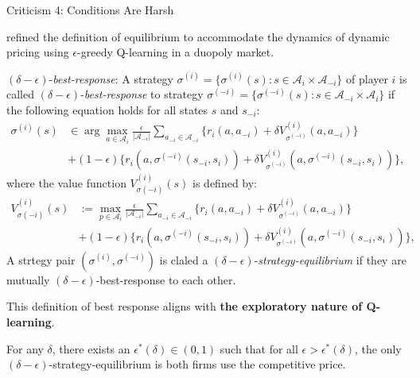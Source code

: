 \documentclass[8pt]{beamer}
\begin{document}
\begin{frame}{Criticism 4: Conditions Are Harsh}

\tiny{\cite{den2022artificial} refined the definition of equilibrium to accommodate the dynamics of dynamic pricing using $\epsilon$-greedy Q-learning in a duopoly market. 

$(\delta-\epsilon)$-\textit{best-response}: A strategy $\sigma^{(i)}=\{\sigma^{(i)}(s):s\in\mathcal{A}_i\times\mathcal{A}_{-i}\}$ of player $i$ is called $(\delta-\epsilon)$-\textit{best-response} to strategy $\sigma^{(-i)}=\{\sigma^{(-i)}(s):s\in\mathcal{A}_{-i}\times\mathcal{A}_{i}\}$ if the following equation holds for all states $s$ and $s_{-i}$:
\[
    \begin{aligned}
        \sigma^{(i)}(s)&\in\arg\max_{a\in\mathcal{A}_{i}}\frac{\epsilon}{|\mathcal{A}_{-i}|}\sum_{a_{-i}\in\mathcal{A}_{-i}}\{r_{i}(a,a_{-i})+\delta V_{\sigma^{(-i)}}^{(i)}(a,a_{-i})\}\\
        &+(1-\epsilon)\{r_{i}(a,\sigma^{(-i)}(s_{-i},s_{i}))+\delta V_{\sigma^{(-i)}}^{(i)}(a,\sigma^{(-i)}(s_{-i},s_{i}))\},
    \end{aligned}
\]
where the value function $V_{\sigma(-i)}^{(i)}(s)$ is defined by:
\[
    \begin{aligned}
        V_{\sigma(-i)}^{(i)}(s)&:=\max_{p\in\mathcal{A}_{i}}\frac{\epsilon}{|\mathcal{A}_{-i}|}\sum_{a_{-i}\in\mathcal{A}_{-i}}\{r_{i}(a,a_{-i})+\delta V_{\sigma^{(-i)}}^{(i)}(a,a_{-i})\}\\
        &+(1-\epsilon)\{r_{i}(a,\sigma^{(-i)}(s_{-i},s_{i}))+\delta V_{\sigma^{(-i)}}^{(i)}(a,\sigma^{(-i)}(s_{-i},s_{i}))\},
    \end{aligned}
\]
A strtegy pair $(\sigma^{(i)},\sigma^{(-i)})$ is claled a $(\delta-\epsilon)$-\textit{strategy-equilibrium} if they are mutually $(\delta-\epsilon)$-best-response to each other. 
\vspace{0.15cm}

This definition of best response aligns with \textbf{the exploratory nature of Q-learning}. 

\vspace{0.15cm}
For any $\delta$, there exists an $\epsilon^*(\delta)\in (0,1)$ such that for all $\epsilon>\epsilon^*(\delta)$, the only $(\delta-\epsilon)$-strategy-equilibrium is both firms use the competitive price.
}
\end{frame}
\end{document}
